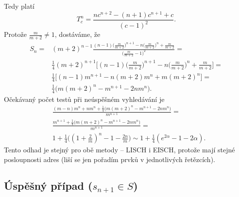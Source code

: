 \documentclass[a4paper,12pt]{article}
\begin{document}
Tedy platí 
$$T_c^n=\frac {nc^{n+2}-(n+1)c^{n+1}+c}{(c-1)^2}.$$
Protože $\frac m{m+2}\ne 1$, dostáváme, že 
\begin{align*} S_n=&(m+2)^{n-1}\frac {(n-1)\big(\frac m{m+2}\big)^{n+1}
-n\big(\frac m{m+2}\big)^n+\frac m{m+2}}{\big(\frac m{m+2}-1\big)^
2}=\\
&\frac 14(m+2)^{n+1}\big[(n-1)\big(\frac m{m+2}\big)^{n+1}-n\big(\frac 
m{m+2}\big)^n+\frac m{m+2}\big]=\\
&\frac 14\big[(n-1)m^{n+1}-n(m+2)m^n+m(m+2)^n\big]=\\
&\frac 14\big(m(m+2)^n-m^{n+1}-2nm^n\big).\end{align*}
Očekávaný počet testů při neúspěšném 
vyhledávání je  
\begin{align*}&\frac {(m-n)m^n+nm^n+\frac 14\big(m(m+2)^n-m^{n+1}-2nm^n\big
)}{m^{n+1}}=\\
&\frac {m^{n+1}+\frac 14\big(m(m+2)^n-m^{n+1}-2nm^n\big)}{m^{n+1}}
=\\
&1+\frac 14\big((1+\frac 2m)^n-1-\frac {2n}m\big)\sim 1+\frac 14(
e^{2\alpha}-1-2\alpha ).\end{align*}
Tento odhad je stejný pro obě metody -- LISCH i EISCH, 
protože mají stejné posloupnosti adres (liší se jen pořadím 
prvků v jednotlivých řetězcích).

\subsection{
\'Uspěšný případ ($s_{n+1}\in S$)
}
\end{document}
